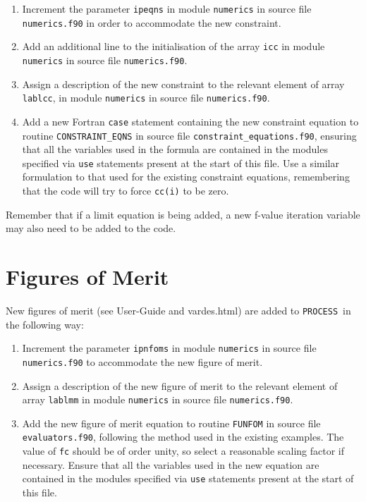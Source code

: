 \documentclass[11pt,a4paper]{report}
\newcommand{\process}{\mbox{\texttt{PROCESS}}}
\begin{document}
\begin{enumerate}

\item Increment the parameter \texttt{ipeqns} in module \texttt{numerics} in
  source file \texttt{numerics.f90} in order to accommodate the new constraint.

\item Add an additional line to the initialisation of the array \texttt{icc}
  in module \texttt{numerics} in source file \texttt{numerics.f90}.

\item Assign a description of the new constraint to the relevant element of
  array \texttt{lablcc}, in module \texttt{numerics} in source file
  \texttt{numerics.f90}.

\item Add a new Fortran \texttt{case} statement containing the new constraint
  equation to routine \texttt{CONSTRAINT\_EQNS} in source file
  \texttt{constraint\_equations.f90}, ensuring that all the variables used in
  the formula are contained in the modules specified via \texttt{use}
  statements present at the start of this file.  Use a similar formulation to
  that used for the existing constraint equations, remembering that the code
  will try to force \texttt{cc(i)} to be zero.


\end{enumerate}

Remember that if a limit equation is being added, a new f-value iteration
variable may also need to be added to the code.

\section{Figures of Merit}

New figures of merit (see User-Guide and vardes.html) are added to \process\ in
the following way:

\begin{enumerate}

\item Increment the parameter \texttt{ipnfoms} in module \texttt{numerics} in
  source file \texttt{numerics.f90} to accommodate the new figure of merit.

\item Assign a description of the new figure of merit to the relevant element
  of array \texttt{lablmm} in module \texttt{numerics} in source file
  \texttt{numerics.f90}.

\item Add the new figure of merit equation to routine \texttt{FUNFOM} in
  source file \texttt{evaluators.f90}, following the method used in the
  existing examples. The value of \texttt{fc} should be of order unity, so
  select a reasonable scaling factor if necessary. Ensure that all the
  variables used in the new equation are contained in the modules specified
  via \texttt{use} statements present at the start of this file.


\end{enumerate}
\end{document}
